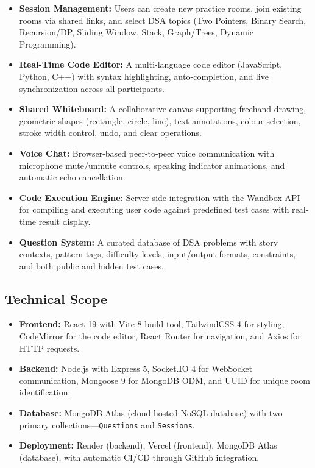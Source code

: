 \documentclass[12pt,a4paper,oneside]{report}
\begin{document}
\begin{itemize}
    \item \textbf{Session Management:} Users can create new practice rooms, join existing rooms via shared links, and select DSA topics (Two Pointers, Binary Search, Recursion/DP, Sliding Window, Stack, Graph/Trees, Dynamic Programming).
    \item \textbf{Real-Time Code Editor:} A multi-language code editor (JavaScript, Python, C++) with syntax highlighting, auto-completion, and live synchronization across all participants.
    \item \textbf{Shared Whiteboard:} A collaborative canvas supporting freehand drawing, geometric shapes (rectangle, circle, line), text annotations, colour selection, stroke width control, undo, and clear operations.
    \item \textbf{Voice Chat:} Browser-based peer-to-peer voice communication with microphone mute/unmute controls, speaking indicator animations, and automatic echo cancellation.
    \item \textbf{Code Execution Engine:} Server-side integration with the Wandbox API for compiling and executing user code against predefined test cases with real-time result display.
    \item \textbf{Question System:} A curated database of DSA problems with story contexts, pattern tags, difficulty levels, input/output formats, constraints, and both public and hidden test cases.
\end{itemize}

\subsection{Technical Scope}

\begin{itemize}
    \item \textbf{Frontend:} React 19 with Vite 8 build tool, TailwindCSS 4 for styling, CodeMirror for the code editor, React Router for navigation, and Axios for HTTP requests.
    \item \textbf{Backend:} Node.js with Express 5, Socket.IO 4 for WebSocket communication, Mongoose 9 for MongoDB ODM, and UUID for unique room identification.
    \item \textbf{Database:} MongoDB Atlas (cloud-hosted NoSQL database) with two primary collections---\texttt{Questions} and \texttt{Sessions}.
    \item \textbf{Deployment:} Render (backend), Vercel (frontend), MongoDB Atlas (database), with automatic CI/CD through GitHub integration.
\end{itemize}
\end{document}
